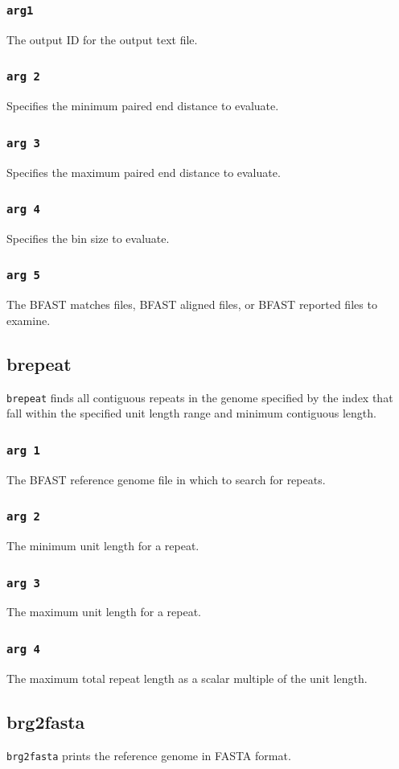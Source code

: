 \documentclass[a4paper,12pt]{book}
\newcommand{\TT}[1]{{\tt #1}} %
\newcommand{\BRGF}{BFAST reference genome file} %
\newcommand{\BMF}{BFAST matches file} %
\newcommand{\BAF}{BFAST aligned file} %
\newcommand{\BRF}{BFAST reported file} %
\begin{document}
\subsubsection{\TT{arg1}}
The output ID for the output text file.
\subsubsection{\TT{arg 2}}
Specifies the minimum paired end distance to evaluate.
\subsubsection{\TT{arg 3}}
Specifies the maximum paired end distance to evaluate.
\subsubsection{\TT{arg 4}}
Specifies the bin size to evaluate.
\subsubsection{\TT{arg 5}}
The \BMF{s}, \BAF{s}, or \BRF{s} to examine.
\subsection{brepeat}
\label{sec:brepeat}
\TT{brepeat} finds all contiguous repeats in the genome specified by the index that fall within the specified unit length range and minimum contiguous length.
\subsubsection{\TT{arg 1}}
The \BRGF{} in which to search for repeats.
\subsubsection{\TT{arg 2}}
The minimum unit length for a repeat.
\subsubsection{\TT{arg 3}}
The maximum unit length for a repeat.
\subsubsection{\TT{arg 4}}
The maximum total repeat length as a scalar multiple of the unit length.
\subsection{brg2fasta}
\label{sec:brg2fasta}
\TT{brg2fasta} prints the reference genome in FASTA format.
\end{document}
